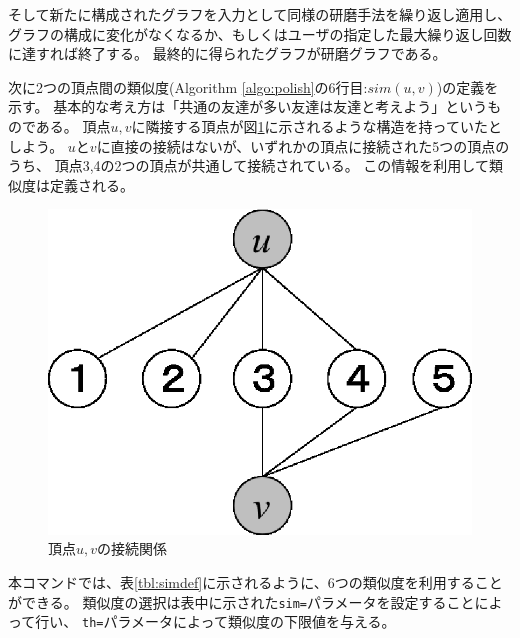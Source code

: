 そして新たに構成されたグラフを入力として同様の研磨手法を繰り返し適用し、
グラフの構成に変化がなくなるか、もしくはユーザの指定した最大繰り返し回数に達すれば終了する。
最終的に得られたグラフが研磨グラフである。

次に2つの頂点間の類似度(Algorithm \ref{algo:polish}の6行目:$sim(u,v)$)の定義を示す。
基本的な考え方は「共通の友達が多い友達は友達と考えよう」というものである。
頂点$u,v$に隣接する頂点が図\ref{fig:sim}に示されるような構造を持っていたとしよう。
$u$と$v$に直接の接続はないが、いずれかの頂点に接続された5つの頂点のうち、
頂点3,4の2つの頂点が共通して接続されている。
この情報を利用して類似度は定義される。

\begin{figure}[htbp]
\begin{center}

\begin{minipage}{0.3\hsize}
\includegraphics[scale=0.5]{./sim.eps}
\caption{頂点$u,v$の接続関係\label{fig:sim}}
\end{minipage}
\end{center}
\end{figure}

本コマンドでは、表\ref{tbl:simdef}に示されるように、6つの類似度を利用することができる。
類似度の選択は表中に示された\verb|sim=|パラメータを設定することによって行い、
\verb|th=|パラメータによって類似度の下限値を与える。

